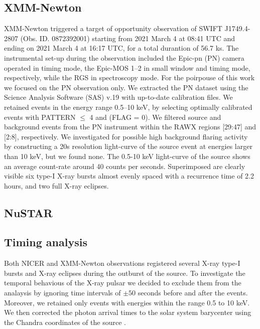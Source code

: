 \documentclass[fleqn,usenatbib]{mnras}
\newcommand{\swiftj}{SWIFT J1749.4-2807}
\begin{document}


\subsection{XMM-Newton}

XMM-Newton \citep{Jansen2001} triggered a target of opportunity observation of \swiftj{} (Obs. ID. 0872392001) starting from 2021 March 4 at 08:41 UTC and ending on 2021 March 4 at 16:17 UTC, for a total durantion of 56.7 ks. 
The instrumental set-up during the observation included the Epic-pn (PN) camera operated in timing mode, the Epic-MOS 1–2 in small window and timing mode, respectively, while the RGS in spectroscopy mode. For the poirpouse of this work we focused on the PN observation only. We extracted the PN dataset using the Science Analysis Software (SAS) v.19 with up-to-date calibration files. We retained events in the energy range 0.5–10 keV, by selecting optimally calibrated events with \textsc{PATTERN $\leq$ 4} and \textsc{(FLAG = 0)}. We filtered source and background events from the PN instrument within the RAWX regions [29:47] and [2:8], respectively. We investigated for possible high background flaring activity by constructing a 20s resolution light-curve of the source event at energies larger than 10 keV, but we found none.  
The 0.5-10 keV light-curve of the source shows an average count-rate around 40 counts per seconds. Superimposed are clearly visible six type-I X-ray bursts almost evenly spaced with a recurrence time of 2.2 hours, and two full X-ray eclipses. 


\subsection{NuSTAR}


\subsection{Timing analysis}

Both NICER and XMM-Newton observations registered several X-ray type-I bursts and X-ray eclipses during the outburst of the source. To investigate the temporal behavious of the X-ray pulsar we decided to exclude them from the analaysis by ignoring time intervals of $\pm 50$ seconds before and after the events. Moreover, we retained only events with energies within the range 0.5 to 10 keV. We then corrected the photon arrival times to the solar system barycenter using the Chandra coordinates of the source \citep{Jonker:2013wp}.
\end{document}
